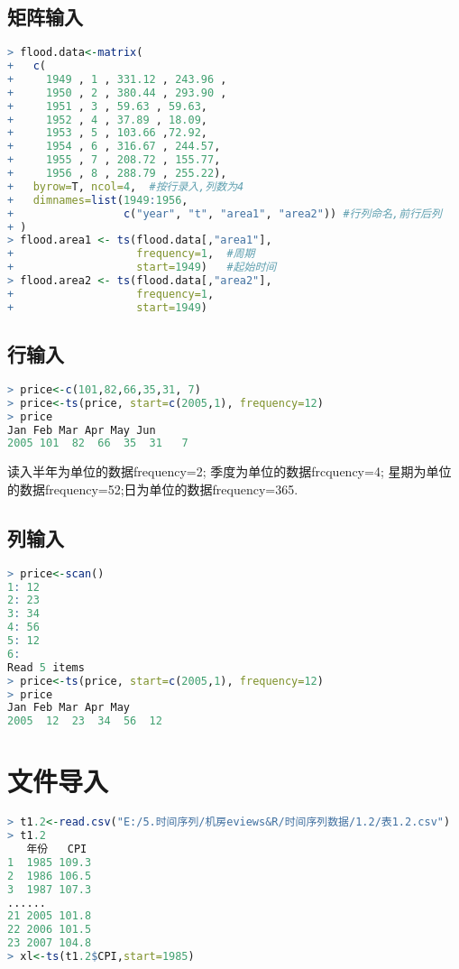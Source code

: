 \documentclass[11pt,a4paper,oneside]{book}
\begin{document}
\subsection{矩阵输入}
\begin{lstlisting}[language=r]
> flood.data<-matrix(
+   c(
+     1949 , 1 , 331.12 , 243.96 ,
+     1950 , 2 , 380.44 , 293.90 ,
+     1951 , 3 , 59.63 , 59.63,
+     1952 , 4 , 37.89 , 18.09,
+     1953 , 5 , 103.66 ,72.92,
+     1954 , 6 , 316.67 , 244.57,
+     1955 , 7 , 208.72 , 155.77,
+     1956 , 8 , 288.79 , 255.22),
+   byrow=T, ncol=4,  #按行录入,列数为4
+   dimnames=list(1949:1956,
+                 c("year", "t", "area1", "area2")) #行列命名,前行后列
+ )
> flood.area1 <- ts(flood.data[,"area1"],
+                   frequency=1,  #周期
+                   start=1949)   #起始时间 
> flood.area2 <- ts(flood.data[,"area2"],
+                   frequency=1,
+                   start=1949)
\end{lstlisting}

\subsection{行输入}
\begin{lstlisting}[language=r]
> price<-c(101,82,66,35,31, 7)
> price<-ts(price, start=c(2005,1), frequency=12)
> price
Jan Feb Mar Apr May Jun
2005 101  82  66  35  31   7
\end{lstlisting}
读入半年为单位的数据frequency=2; 季度为单位的数据frcquency=4;
星期为单位的数据frequency=52;日为单位的数据frequency=365.

\subsection{列输入}
\begin{lstlisting}[language=r]
> price<-scan()
1: 12
2: 23
3: 34
4: 56
5: 12
6: 
Read 5 items
> price<-ts(price, start=c(2005,1), frequency=12)
> price
Jan Feb Mar Apr May
2005  12  23  34  56  12
\end{lstlisting}

\section{文件导入}
\begin{lstlisting}[language=r]
> t1.2<-read.csv("E:/5.时间序列/机房eviews&R/时间序列数据/1.2/表1.2.csv")
> t1.2
   年份   CPI
1  1985 109.3
2  1986 106.5
3  1987 107.3
......
21 2005 101.8
22 2006 101.5
23 2007 104.8
> xl<-ts(t1.2$CPI,start=1985)
\end{lstlisting}
\end{document}
